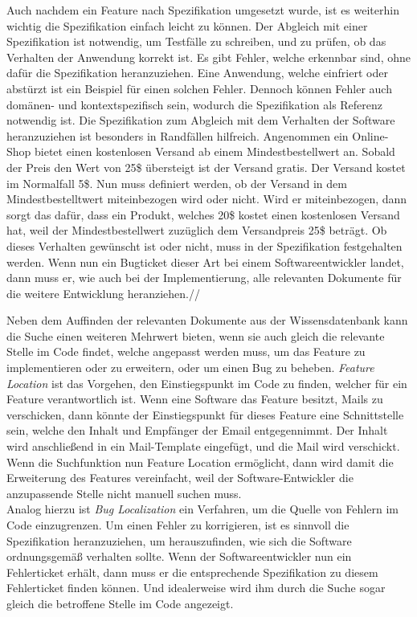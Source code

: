 Auch nachdem ein Feature nach Spezifikation umgesetzt wurde, ist es weiterhin wichtig die Spezifikation einfach leicht zu können.
Der Abgleich mit einer Spezifikation ist notwendig, um Testfälle zu schreiben, und zu prüfen, ob das Verhalten der Anwendung korrekt ist.
Es gibt Fehler, welche erkennbar sind, ohne dafür die Spezifikation heranzuziehen.
Eine Anwendung, welche einfriert oder abstürzt ist ein Beispiel für einen solchen Fehler.
Dennoch können Fehler auch domänen- und kontextspezifisch sein, wodurch die Spezifikation als Referenz notwendig ist.
Die Spezifikation zum Abgleich mit dem Verhalten der Software heranzuziehen ist besonders in Randfällen hilfreich.
Angenommen ein Online-Shop bietet einen kostenlosen Versand ab einem Mindestbestellwert an.
Sobald der Preis den Wert von 25\$ übersteigt ist der Versand gratis.
Der Versand kostet im Normalfall 5\$.
Nun muss definiert werden, ob der Versand in dem Mindestbestelltwert miteinbezogen wird oder nicht.
Wird er miteinbezogen, dann sorgt das dafür, dass ein Produkt, welches 20\$ kostet einen kostenlosen Versand hat, weil der Mindestbestellwert zuzüglich dem Versandpreis 25\$ beträgt.
Ob dieses Verhalten gewünscht ist oder nicht, muss in der Spezifikation festgehalten werden.
Wenn nun ein Bugticket dieser Art bei einem Softwareentwickler landet, dann muss er, wie auch bei der Implementierung, alle relevanten Dokumente für die weitere Entwicklung heranziehen.//

Neben dem Auffinden der relevanten Dokumente aus der Wissensdatenbank kann die Suche einen weiteren Mehrwert bieten, wenn sie auch gleich die relevante Stelle im Code findet, welche angepasst werden muss, um das Feature zu implementieren oder zu erweitern, oder um einen Bug zu beheben.
\textit{Feature Location} ist das Vorgehen, den Einstiegspunkt im Code zu finden, welcher für ein Feature verantwortlich ist.
Wenn eine Software das Feature besitzt, Mails zu verschicken, dann könnte der Einstiegspunkt für dieses Feature eine Schnittstelle sein, welche den Inhalt und Empfänger der Email entgegennimmt.
Der Inhalt wird anschließend in ein Mail-Template eingefügt, und die Mail wird verschickt.
Wenn die Suchfunktion nun Feature Location ermöglicht, dann wird damit die Erweiterung des Features vereinfacht, weil der Software-Entwickler die anzupassende Stelle nicht manuell suchen muss.\\

Analog hierzu ist \textit{Bug Localization} ein Verfahren, um die Quelle von Fehlern im Code einzugrenzen.
Um einen Fehler zu korrigieren, ist es sinnvoll die Spezifikation heranzuziehen, um herauszufinden, wie sich die Software ordnungsgemäß verhalten sollte.
Wenn der Softwareentwickler nun ein Fehlerticket erhält, dann muss er die entsprechende Spezifikation zu diesem Fehlerticket finden können.
Und idealerweise wird ihm durch die Suche sogar gleich die betroffene Stelle im Code angezeigt.

